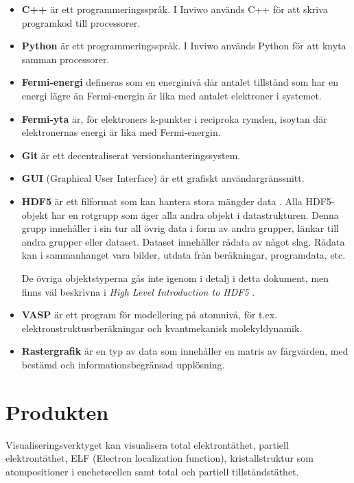 \documentclass[a4paper,12pt]{article}
\begin{document}
\begin{itemize}
\item \textbf{C++} är ett programmeringsspråk.
	\cite{C++}
	\newline
	I Inviwo används C++ för att skriva programkod till processorer.

\item \textbf{Python} är ett programmeringsspråk.
	\cite{Python}
	\newline
	I Inviwo används Python för att knyta samman processorer.

\item \textbf{Fermi-energi} defineras som en energinivå där antalet tillstånd som har en energi lägre än Fermi-energin är lika med antalet elektroner i systemet. \cite{Fermi-energi}

\item \textbf{Fermi-yta} är, för elektroners k-punkter i reciproka rymden, isoytan där elektronernas energi är lika med Fermi-energin.
\cite{Fermi-yta}

\item \textbf{Git} är ett decentraliserat versionshanteringssystem.
\cite{Git}
    
\item \textbf{GUI} (Graphical User Interface) är ett grafiskt
användargränssnitt.
\cite{GUI}

\item \textbf{HDF5} är ett filformat som kan hantera stora mängder data \cite{hdf5}. Alla HDF5-objekt har en rotgrupp som äger alla andra objekt i datastrukturen. Denna grupp innehåller i sin tur all övrig data i form av andra grupper, länkar till andra grupper eller dataset. Dataset innehåller rådata av något slag. Rådata kan i sammanhanget vara bilder, utdata från beräkningar, programdata, etc. \cites[4-5]{hdf5-intro}

De övriga objektstyperna gås inte igenom i detalj i detta dokument,
men finns väl beskrivna i \emph{High Level Introduction to HDF5} \cite{hdf5-intro}.

\item \textbf{VASP} är ett program för modellering på atomnivå, för t.ex. elektronstruktusrberäkningar och kvantmekanisk molekyldynamik.
\cite{VASP}

\item \textbf{Rastergrafik} är en typ av data som innehåller en matris av färgvärden, med bestämd och informationsbegränsad upplösning.
\cite{raster}

\end{itemize}

\section{Produkten}
Visualiseringsverktyget kan visualisera total elektrontäthet, partiell elektrontäthet, ELF (Electron localization function), kristallstruktur som atompositioner i enehetscellen samt total och partiell tillståndstäthet.
\end{document}
